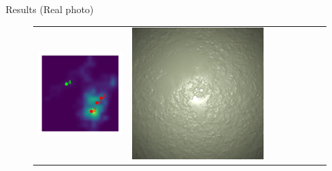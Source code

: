 \documentclass[final]{beamer}
\newlength{\twocolwid}
\newlength{\resultwidth}
\begin{document}
\begin{frame}[t]
\begin{columns}[t]
\begin{column}{\twocolwid}
\begin{block}{Results (Real photo)}
\begin{figure}[t]
\begin{tabular}{ccrclccc}
            		\includegraphics[width=\resultwidth]{real/plaster/posterior.pdf} &
            		\includegraphics[width=\resultwidth]{real/plaster/good1.jpg} &

\end{tabular}
\end{figure}
\end{block}
\end{column}
\end{columns}
\end{frame}
\end{document}
